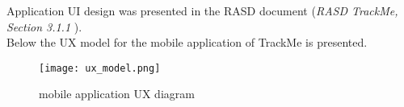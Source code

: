 \documentclass[../main.tex]{subfiles}
\begin{document}
Application UI design was presented in the RASD document (\textit{RASD TrackMe, Section 3.1.1  }).\\
Below the UX model for the mobile application of TrackMe is presented.



\begin{figure}[H]
	\texttt{[image: ux\_model.png]}
	\caption{mobile application UX diagram}
	\label{fig:ux_diagram}
\end{figure}
\end{document}
